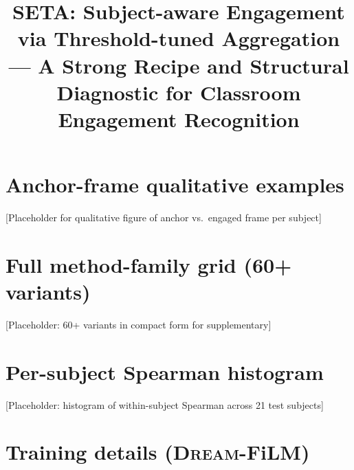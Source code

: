 \documentclass{bmvc2k}   %
\title{SETA: Subject-aware Engagement via Threshold-tuned Aggregation\\
       --- A Strong Recipe and Structural Diagnostic for Classroom
       Engagement Recognition}
\begin{document}
\maketitle












\clearpage
\appendix
\section{Anchor-frame qualitative examples}
\label{sec:anchor-qual}
[Placeholder for qualitative figure of anchor vs.\ engaged frame per subject]

\section{Full method-family grid (60+ variants)}
\label{sec:full-table}
[Placeholder: 60+ variants in compact form for supplementary]

\section{Per-subject Spearman histogram}
\label{sec:per-subj-rho}
[Placeholder: histogram of within-subject Spearman across 21 test subjects]

\section{Training details (\textsc{Dream}-FiLM)}
\label{sec:training}
\end{document}

